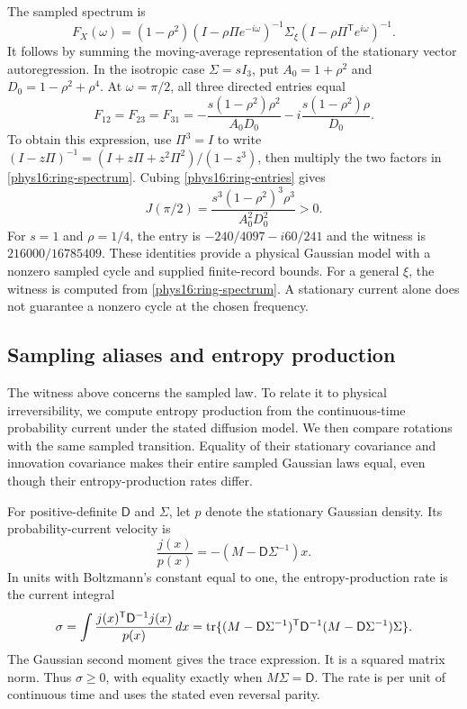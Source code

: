 The sampled spectrum is
\begin{equation}
 F_X(\omega)=(1-\rho^2)
 (I-\rho\Pi e^{-i\omega})^{-1}\Sigma_\xi
 (I-\rho\Pi^{\mathsf T}e^{i\omega})^{-1}.
 \label{phys16:ring-spectrum}
\end{equation}
It follows by summing the moving-average representation of the stationary vector autoregression. In the isotropic case $\Sigma=sI_3$, put $A_0=1+\rho^2$ and $D_0=1-\rho^2+\rho^4$. At $\omega=\pi/2$, all three directed entries equal
\begin{equation}
 F_{12}=F_{23}=F_{31}
 =-\frac{s(1-\rho^2)\rho^2}{A_0D_0}
  -i\frac{s(1-\rho^2)\rho}{D_0}.
 \label{phys16:ring-entries}
\end{equation}
To obtain this expression, use $\Pi^3=I$ to write
$(I-z\Pi)^{-1}=(I+z\Pi+z^2\Pi^2)/(1-z^3)$, then multiply the two factors in \eqref{phys16:ring-spectrum}. Cubing \eqref{phys16:ring-entries} gives
\begin{equation}
 J(\pi/2)=\frac{s^3(1-\rho^2)^3\rho^3}{A_0^2D_0^2}>0.
 \label{phys16:ring-witness}
\end{equation}
For $s=1$ and $\rho=1/4$, the entry is $-240/4097-i60/241$ and the witness is $216000/16785409$. These identities provide a physical Gaussian model with a nonzero sampled cycle and supplied finite-record bounds. For a general $\xi$, the witness is computed from \eqref{phys16:ring-spectrum}. A stationary current alone does not guarantee a nonzero cycle at the chosen frequency.

\subsection{Sampling aliases and entropy production}

The witness above concerns the sampled law. To relate it to physical irreversibility, we compute entropy production from the continuous-time probability current under the stated diffusion model. We then compare rotations with the same sampled transition. Equality of their stationary covariance and innovation covariance makes their entire sampled Gaussian laws equal, even though their entropy-production rates differ.

For positive-definite $\mathsf D$ and $\Sigma$, let $p$ denote the stationary Gaussian density. Its probability-current velocity is
\[
 \frac{j(x)}{p(x)}=-(M-\mathsf D\Sigma^{-1})x.
\]
In units with Boltzmann's constant equal to one, the entropy-production rate is the current integral~\cite{seifert2012}
\begin{equation}
 \sigma=\int\frac{j(x)^{\mathsf T}\mathsf D^{-1}j(x)}{p(x)}\,dx
 =\operatorname{tr}\{(M-\mathsf D\Sigma^{-1})^{\mathsf T}
 \mathsf D^{-1}(M-\mathsf D\Sigma^{-1})\Sigma\}.
 \label{phys16:entropy}
\end{equation}
The Gaussian second moment gives the trace expression. It is a squared matrix norm. Thus $\sigma\ge0$, with equality exactly when $M\Sigma=\mathsf D$. The rate is per unit of continuous time and uses the stated even reversal parity.

